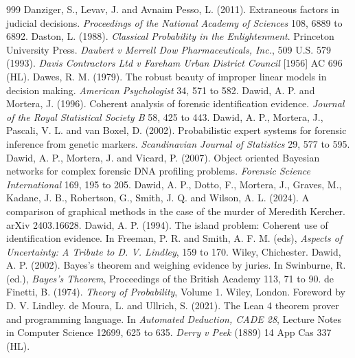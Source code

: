 \begin{thebibliography}{999}
 Danziger, S., Levav, J. and Avnaim Pesso, L. (2011). Extraneous factors in judicial decisions. \emph{Proceedings of the National Academy of Sciences} 108, 6889 to 6892.
 Daston, L. (1988). \emph{Classical Probability in the Enlightenment}. Princeton University Press.
 \emph{Daubert v Merrell Dow Pharmaceuticals, Inc.}, 509 U.S. 579 (1993).
 \emph{Davis Contractors Ltd v Fareham Urban District Council} [1956] AC 696 (HL).
 Dawes, R. M. (1979). The robust beauty of improper linear models in decision making. \emph{American Psychologist} 34, 571 to 582.
 Dawid, A. P. and Mortera, J. (1996). Coherent analysis of forensic identification evidence. \emph{Journal of the Royal Statistical Society B} 58, 425 to 443.
 Dawid, A. P., Mortera, J., Pascali, V. L. and van Boxel, D. (2002). Probabilistic expert systems for forensic inference from genetic markers. \emph{Scandinavian Journal of Statistics} 29, 577 to 595.
 Dawid, A. P., Mortera, J. and Vicard, P. (2007). Object oriented Bayesian networks for complex forensic DNA profiling problems. \emph{Forensic Science International} 169, 195 to 205.
 Dawid, A. P., Dotto, F., Mortera, J., Graves, M., Kadane, J. B., Robertson, G., Smith, J. Q. and Wilson, A. L. (2024). A comparison of graphical methods in the case of the murder of Meredith Kercher. arXiv 2403.16628.
 Dawid, A. P. (1994). The island problem: Coherent use of identification evidence. In Freeman, P. R. and Smith, A. F. M. (eds), \emph{Aspects of Uncertainty: A Tribute to D. V. Lindley}, 159 to 170. Wiley, Chichester.
 Dawid, A. P. (2002). Bayes's theorem and weighing evidence by juries. In Swinburne, R. (ed.), \emph{Bayes's Theorem}, Proceedings of the British Academy 113, 71 to 90.
 de Finetti, B. (1974). \emph{Theory of Probability}, Volume 1. Wiley, London. Foreword by D. V. Lindley.
 de Moura, L. and Ullrich, S. (2021). The Lean 4 theorem prover and programming language. In \emph{Automated Deduction, CADE 28}, Lecture Notes in Computer Science 12699, 625 to 635.
 \emph{Derry v Peek} (1889) 14 App Cas 337 (HL).

\end{thebibliography}
